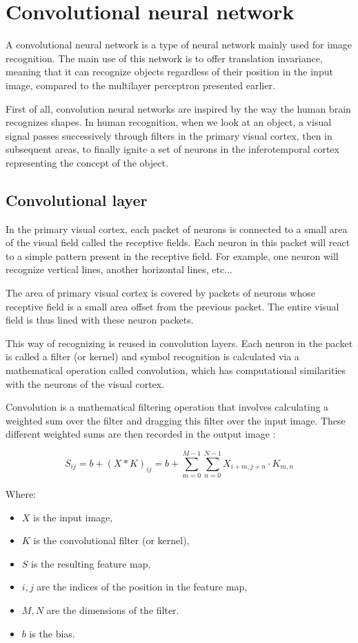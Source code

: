 \documentclass[a4paper, twocolumn, twoside]{article}
\begin{document}
	\section{Convolutional neural network}
	A convolutional neural network is a type of neural network mainly used for image recognition. The main use of this network is to offer translation invariance, meaning that it can recognize objects regardless of their position in the input image, compared to the multilayer perceptron presented earlier.
 
    First of all, convolution neural networks are inspired by the way the human brain recognizes shapes. In human recognition, when we look at an object, a visual signal passes successively through filters in the primary visual cortex, then in subsequent areas, to finally ignite a set of neurons in the inferotemporal cortex representing the concept of the object.
    
    \subsection{Convolutional layer}
    In the primary visual cortex, each packet of neurons is connected to a small area of the visual field called the receptive fields. Each neuron in this packet will react to a simple pattern present in the receptive field. For example, one neuron will recognize vertical lines, another horizontal lines, etc...
    
    The area of primary visual cortex is covered by packets of neurons whose receptive field is a small area offset from the previous packet. The entire visual field is thus lined with these neuron packets.

    This way of recognizing is reused in convolution layers. Each neuron in the packet is called a filter (or kernel) and symbol recognition is calculated via a mathematical operation called convolution, which has computational similarities with the neurons of the visual cortex.
    
    Convolution is a mathematical filtering operation that involves calculating a weighted sum over the filter and dragging this filter over the input image. These different weighted sums are then recorded in the output image :

        \[
    S_{ij} = b + (X * K)_{ij} = b + \sum_{m=0}^{M-1} \sum_{n=0}^{N-1} X_{i+m, j+n} \cdot K_{m, n}
    \]
    
    Where:
    \begin{itemize}
      \item $X$ is the input image,
      \item $K$ is the convolutional filter (or kernel),
      \item $S$ is the resulting feature map,
      \item $i, j$ are the indices of the position in the feature map,
      \item $M, N$ are the dimensions of the filter.
      \item $b$ is the bias.
    \end{itemize}
\end{document}

